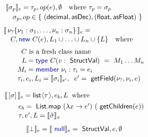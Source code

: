 \documentclass[10pt,preprint,clearpagebib]{sigplanconf}
\newcommand{\langl}{\begin{picture}(4.5,7)
\put(1.1,2.5){\rotatebox{60}{\line(1,0){5.5}}}
\put(1.1,2.5){\rotatebox{300}{\line(1,0){5.5}}}
\end{picture}}
\newcommand{\rangl}{\begin{picture}(4.5,7)
\put(.9,2.5){\rotatebox{120}{\line(1,0){5.5}}}
\put(.9,2.5){\rotatebox{240}{\line(1,0){5.5}}}
\end{picture}}
\newcommand{\kvd}[1]{\textnormal{\textcolor{kvdclr}{\sffamily #1}}}
\newcommand{\ident}[1]{\textnormal{\sffamily #1}}
\newcommand{\sem}[1]{\llbracket #1 \rrbracket}
\begin{document}
\begin{figure}
\begin{multicols}{2}
\noindent
\begin{equation*}
\begin{array}{l}
 \sem{\sigma_p}_e = \tau_p,op(e),\emptyset\quad\textnormal{where}~\tau_p = \sigma_p \\[0.2em]
\quad\sigma_p, op\in  \{~(\ident{decimal},\ident{asDec}), (\ident{float},\ident{asFloat})~\}
\end{array}
\end{equation*}
%
\begin{equation*}
\begin{array}{l}
 \sem{\,\nu_? \{ \nu_1 : \sigma_1, \ldots, \nu_n : \sigma_n \}\,}_e = \\[0.1em]
 \quad C, \kvd{new}~C(e), L_1\cup\ldots\cup L_n\cup\{ L \}\quad\textnormal{where}\\[0.6em]
 \qquad \;\;C~\textnormal{is a fresh class name} \\[0.1em]
 \qquad \;\,\,L = \kvd{type}~C(v:\ident{StructVal})~=~M_1\ldots M_n  \\[0.1em]
 \qquad M_i = \kvd{member}~\nu_i:\tau_i=e_i\\[0.1em]
 \qquad \tau_i, e_i, L_i = \sem{\sigma_i}_{e'},\;\; e'=\ident{getField}(\nu_?, \nu_i, e)\\[0.6em]
\end{array}
\end{equation*}
%
\begin{equation*}
\begin{array}{l}
 \sem{\,[\sigma]\,}_e = \ident{list}\langl\tau\rangl, e_b, L \;\;\textnormal{where}\\[0.4em]
 \qquad e_b = \ident{List.map}~(\lambda x\rightarrow e')~(\ident{getChildren}(e)) \\[0.1em]
 \qquad \tau, e', L = \sem{\hat{\sigma}}_x
\end{array}
\end{equation*}
%
\begin{equation*}
\begin{array}{l}
 \sem{\bot}_e = \sem{\kvd{null}}_e = \ident{StructVal}, e, \emptyset
\end{array}
\end{equation*}


\end{multicols}
\end{figure}
\end{document}
